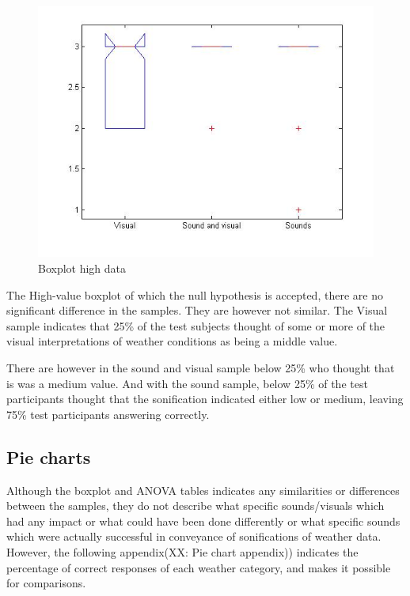 \begin{figure}[!htbp]
    \centering
    \includegraphics[width=.7\textwidth]{images/Evaluation8.jpg}
    \caption{Boxplot high data}
    \label{fig:evaluation8}
\end{figure}

The High-value boxplot of which the null hypothesis is accepted, there are no significant difference in the samples. 
They are however not similar.
The Visual sample indicates that 25\% of the test subjects thought of some or more of the visual interpretations of weather conditions as being a middle value.

There are however in the sound and visual sample below 25\% who thought that is was a medium value. 
And with the sound sample, below 25\% of the test participants thought that the sonification indicated either low or medium, leaving 75\% test participants answering correctly.


\FloatBarrier
\subsection{Pie charts} %
\label{sub:pie_charts}

Although the boxplot and ANOVA tables indicates any similarities or differences between the samples, they do not describe what specific sounds/visuals which had any impact or what could have been done differently or what specific sounds which were actually successful in conveyance of sonifications of weather data.
However, the following appendix(XX: Pie chart appendix)) indicates the percentage of correct responses of each weather category, and makes it possible for comparisons. 


